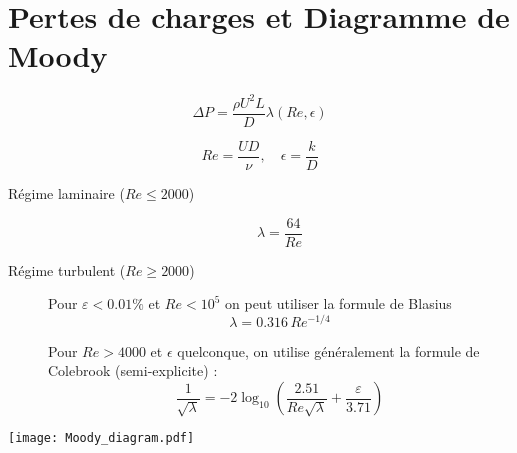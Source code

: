 













\clearpage
\section{Pertes de charges et Diagramme de Moody}
$$
\Delta P = \frac{\rho U^2 L}{D} \lambda(Re,\epsilon)
$$

$$ 
Re = \frac{U D}{\nu}, \quad \epsilon = \frac{k}{D}
$$

\begin{description}
\item[Régime laminaire ($Re \leq 2000$) ]
$$
\lambda = \frac{64}{Re}
$$
\item[Régime turbulent  ($Re \geq 2000$) ]

Pour $\varepsilon < 0.01\%$ et $Re<10^5$ on peut utiliser  la formule de Blasius
\begin{equation}
   \lambda= 0.316 \, Re^{-1/4}
 \end{equation}

Pour $Re >4000$ et $\epsilon$ quelconque, on utilise généralement la formule de Colebrook (semi-explicite) :
\begin{equation}
  \frac{1}{\sqrt{\lambda}} = -2 \log_{10} \left (
  \frac{2.51}{Re\sqrt{\lambda}} + \frac{\varepsilon}{3.71}
  \right)
\end{equation}
\end{description}



\texttt{[image: Moody\_diagram.pdf]}




